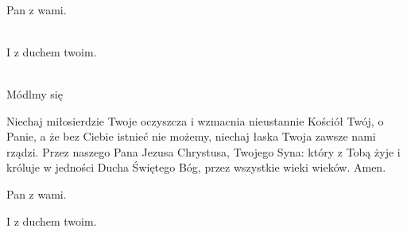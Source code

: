 \newcommand{\dominusvobiscum}{
  \rubric{\Vbar}Pan z wami.
}
\newcommand{\etcumspiritutuo}{
  \rubric{\Rbar}I z duchem twoim.
}

\\
\dominusvobiscum
\\
\etcumspiritutuo
\\
Módlmy się

Niechaj miłosierdzie Twoje oczyszcza i wzmacnia nieustannie Kościół Twój, o Panie, a że bez Ciebie istnieć nie możemy, niechaj łaska Twoja zawsze nami rządzi. Przez naszego Pana Jezusa Chrystusa, Twojego Syna: który z Tobą żyje i króluje w jedności Ducha Świętego Bóg, przez wszystkie wieki wieków. \rubric{\Rbar} Amen.

\dominusvobiscum

\etcumspiritutuo
